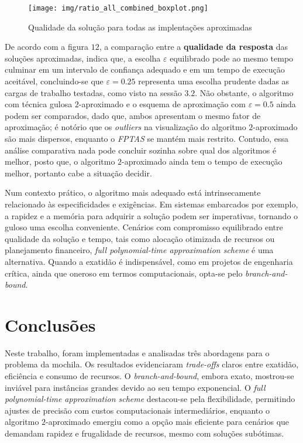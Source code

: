 \documentclass[12pt]{article}
\begin{document}
\begin{figure}
    \centering
    \texttt{[image: img/ratio\_all\_combined\_boxplot.png]}
    \caption{Qualidade da solução para todas as implentações aproximadas}
    \label{fig:enter-label}
\end{figure}


De acordo com a figura \(12\), a comparação entre a \textbf{qualidade da resposta} das soluções aproximadas, indica que, a escolha \(\varepsilon\) equilibrado pode ao mesmo tempo culminar em um intervalo de confiança adequado e em um tempo de execução aceitável, concluindo-se que \(\varepsilon=0.25\) representa uma escolha prudente dadas as cargas de trabalho testadas, como visto na sessão \(3.2\). Não obstante, o algoritmo com técnica gulosa \(2\)-aproximado e o esquema de aproximação com \(\varepsilon=0.5\) ainda podem ser comparados, dado que, ambos apresentam o mesmo fator de aproximação; é notório que os \textit{outliers} na visualização do algoritmo \(2\)-aproximado são mais dispersos, enquanto o \textit{FPTAS} se mantém mais restrito. Contudo, essa análise comparativa nada pode concluir sozinha sobre qual dos algoritmos é melhor, posto que, o algoritmo \(2\)-aproximado ainda tem o tempo de execução melhor, portanto cabe a situação decidir.

Num contexto prático, o algoritmo mais adequado está intrinsecamente relacionado às especificidades e exigências. Em sistemas embarcados por exemplo, a rapidez e a memória para adquirir a solução podem ser imperativas, tornando o guloso uma escolha conveniente. Cenários com compromisso equilibrado entre qualidade da solução e tempo, tais como alocação otimizada de recursos ou planejamento financeiro, \textit{full polynomial-time approximation scheme} é uma alternativa. Quando a exatidão é indispensável, como em projetos de engenharia crítica, ainda que oneroso em termos computacionais, opta-se pelo \textit{branch-and-bound}.


\section{Conclusões}

Neste trabalho, foram implementadas e analisadas três abordagens para o problema da mochila. Os resultados evidenciaram \textit{trade-offs} claros entre exatidão, eficiência e consumo de recursos. O \textit{branch-and-bound}, embora exato, mostrou-se inviável para instâncias grandes devido ao seu tempo exponencial. O \textit{full polynomial-time approximation scheme} destacou-se pela flexibilidade, permitindo ajustes de precisão com custos computacionais intermediários, enquanto o algoritmo \(2\)-aproximado emergiu como a opção mais eficiente para cenários que demandam rapidez e frugalidade de recursos, mesmo com soluções subótimas. 
\end{document}
